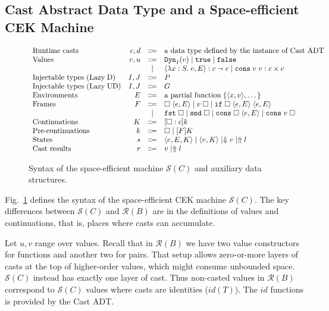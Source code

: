 \documentclass[runningheads]{llncs}
\newcommand{\stxrule}[3]{\text{#2} & #1 & \Coloneqq & #3\\}
\newcommand{\stxrulecont}[1]{& & | & #1 \\}
\newcommand{\figref}[1]{Fig.~\ref{#1}}
\newcommand{\LUD}{\ensuremath{\text{Lazy\;UD}}}
\newcommand{\LD}{\ensuremath{\text{Lazy\;D}}}
\newcommand{\RMachine}[1]{\ensuremath{\mathcal{R}(#1)}}
\newcommand{\SMachine}[1]{\ensuremath{\mathcal{S}(#1)}}
\newcommand{\error}[1]{\ensuremath{\Uparrow#1}}
\newcommand{\Pfunc}[2]{\ensuremath{#1 \shortrightarrow #2}}
\newcommand{\Pprod}[2]{\ensuremath{#1 \times #2}}
\newcommand{\elam}[3]{\lambda#1:#2.\;#3}
\newcommand{\eapp}[2]{#1\;#2}
\newcommand{\eif}[3]{\mathtt{if}\;#1\;#2\;#3}
\newcommand{\econs}[2]{\mathtt{cons} \; #1 \; #2}
\newcommand{\efst}[1]{\mathtt{fst} \; #1}
\newcommand{\esnd}[1]{\mathtt{snd} \; #1}
\newcommand{\ecast}[2]{\ensuremath{#1 : #2}}
\newcommand{\vdyn}[2]{\mathtt{Dyn}_{#1}(#2)}
\newcommand{\vtrue}[0]{\mathtt{true}}
\newcommand{\vfalse}[0]{\mathtt{false}}
\newcommand{\vfunc}[4]{\langle\elam{#1}{#2}{#3},#4\rangle}
\newcommand{\vcons}[2]{\econs{#1}{#2}}
\newcommand{\sexpr}[3]{\ensuremath{\langle#1,#2,#3\rangle}}
\newcommand{\scont}[2]{\ensuremath{\langle#1,#2\rangle}}
\newcommand{\shalt}[1]{\ensuremath{\Downarrow #1}}
\newcommand{\Knil}[0]{\Box}
\newcommand{\Kcons}[2]{[#1]#2}
\newcommand{\closure}[2]{\langle#1,#2\rangle}
\newcommand{\FappXO}[2]{\eapp{\square}{\closure{#1}{#2}}}
\newcommand{\FappOX}[1]{\eapp{#1}{\square}}
\newcommand{\Fif}[3]{\eif{\square}{\closure{#1}{#3}}{\closure{#2}{#3}}}
\newcommand{\FconsXO}[2]{\econs{\square}{\closure{#1}{#2}}}
\newcommand{\FconsOX}[1]{\econs{#1}{\square}}
\newcommand{\Ffst}[0]{\efst{\square}}
\newcommand{\Fsnd}[0]{\esnd{\square}}
\newcommand{\Fcast}[1]{\ecast{\square}{#1}}
\begin{document}
\subsection{Cast Abstract Data Type and a Space-efficient CEK Machine}
\label{sec:cast-adt-and-space-efficient-cek}

\begin{figure}
	\[
	\begin{array}{lrcl}
	\stxrule{c,d}{Runtime casts}{\text{a data type defined by the 
	instance of Cast ADT}}
	\stxrule{v,u}{Values}{
		\vdyn{I}{v}  \mid
		\vtrue       \mid
		\vfalse                     
	}
	\stxrulecont{
		\ecast{\vfunc{x}{S}{e}{E}}{\Pfunc{c}{c}} \mid
		\ecast{\vcons{v}{v}}{\Pprod{c}{c}}
	}
	\stxrule{I,J}{Injectable types (\LD)}{P}
	\stxrule{I,J}{Injectable types (\LUD)}{G}
	\stxrule{E}{Environments}{
		\text{a partial function}\;\{\langle x , v \rangle , \dots \}
	}
	\stxrule{F}{Frames}{
		\FappXO{e}{E}  \mid
		\FappOX{v}     \mid
		\Fif{e}{e}{E}
	}
	\stxrulecont{
		\Ffst \mid
		\Fsnd \mid
		\FconsXO{e}{E}  \mid
		\FconsOX{v}
	}
	\stxrule{K}{Continuations}{
		\Kcons{\Fcast{c}}{k}
	}
	\stxrule{k}{Pre-continuations}{
		\Knil         \mid
		\Kcons{F}{K}
	}
	\stxrule{s}{States}{
		\sexpr{e}{E}{K}  \mid
		\scont{v}{K}     \mid
		\shalt{v}        \mid
		\error{l}
	}
	\stxrule{r}{Cast results}{
		v \mid
		\error{l}
	}
	\end{array}
	\]
	
	\caption{Syntax of the space-efficient machine \SMachine{C} and auxiliary 
	data structures.}
	\label{fig:SEMachine-state}
\end{figure}

\figref{fig:SEMachine-state} defines the syntax of the space-efficient CEK 
machine \SMachine{C}.
The key differences between \SMachine{C} and \RMachine{B} are in the definitions
of values and continuations, that is, places where casts can accumulate.

Let $u,v$ range over values.
%
Recall that in \RMachine{B} we have two value constructors for functions and 
another two for pairs. That setup allows zero-or-more layers of casts at the 
top of higher-order values, which might consume unbounded space. 
%
\SMachine{C} instead has exactly one layer of cast.
Thus non-casted values in \RMachine{B} correspond to \SMachine{C} values
where casts are identities ($\mathit{id}(T)$). The 
$\mathit{id}$ functions is provided by the Cast ADT.
\end{document}
